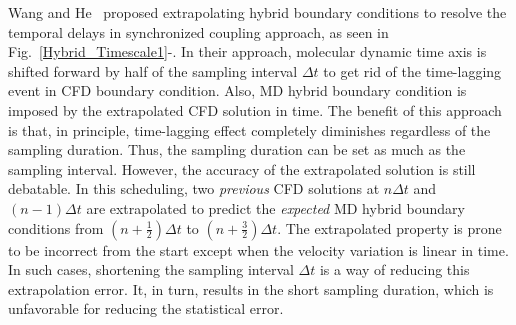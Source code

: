 \documentclass[preprint,12pt]{elsarticle}
\begin{document}
Wang and He~\cite{Wang} proposed extrapolating hybrid boundary conditions
to resolve the temporal delays in synchronized coupling approach, as seen in
Fig.~\ref{Hybrid_Timescale1}-. In their approach,
molecular dynamic time axis is shifted forward by half of the sampling interval
${\Delta}t$ to get rid of the time-lagging event in CFD boundary condition.
Also, MD hybrid boundary condition is imposed by the extrapolated CFD solution
in time. The benefit of this approach is that, in principle,
time-lagging effect completely diminishes regardless of the sampling duration.
Thus, the sampling duration can be set as much as the sampling interval.
However, the accuracy of the extrapolated solution is still debatable.
In this scheduling, two \textit{previous} CFD solutions
at $n{\Delta}t$ and $(n-1){\Delta}t$ are extrapolated to predict the
\textit{expected} MD hybrid boundary conditions
from $(n+\frac{1}{2}){\Delta}t$ to $(n+\frac{3}{2}){\Delta}t$.
The extrapolated property is prone to be incorrect from the start
except when the velocity variation is linear in time. In such cases, shortening the sampling
interval ${\Delta}t$ is a way of reducing this extrapolation error. It, in turn, results in
the short sampling duration, which is unfavorable for reducing the statistical error.
\end{document}
